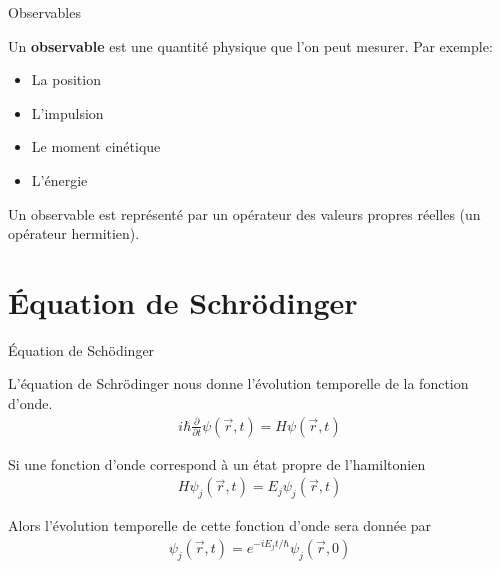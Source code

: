 \documentclass[xcolor=svgnames,t,aspectratio=169,handout]{uqtrcours}
\begin{document}
\begin{frame}{Observables}


Un \textbf{observable} est une quantité physique que l'on peut mesurer.
%
Par exemple:
\begin{itemize}
  \item La position
  \item L'impulsion
  \item Le moment cinétique
  \item L'énergie
\end{itemize}

\medskip

Un observable est représenté par un opérateur
  des valeurs propres réelles (un opérateur hermitien).

\end{frame}





\section{Équation de Schrödinger}
\frame{\sectionpage}




\begin{frame}{Équation de Schödinger}


L'équation de Schrödinger nous donne l'évolution temporelle 
  de la fonction d'onde.
\begin{align}
  i \hbar \frac{\partial}{\partial t}
  \psi(\vec r, t)
  =
  H \psi(\vec r, t)
\end{align}

Si une fonction d'onde correspond à un état propre de l'hamiltonien
\begin{align}
  H \psi_{j}(\vec r, t)
  =
  E_{j} \psi_{j}(\vec r, t)
\end{align}

Alors l'évolution temporelle de cette fonction d'onde
  sera donnée par
\begin{align}
  \psi_{j}(\vec r, t) = e^{-i E_{j} t / \hbar} \psi_{j}(\vec r, 0)
\end{align}

\end{frame}
\end{document}
